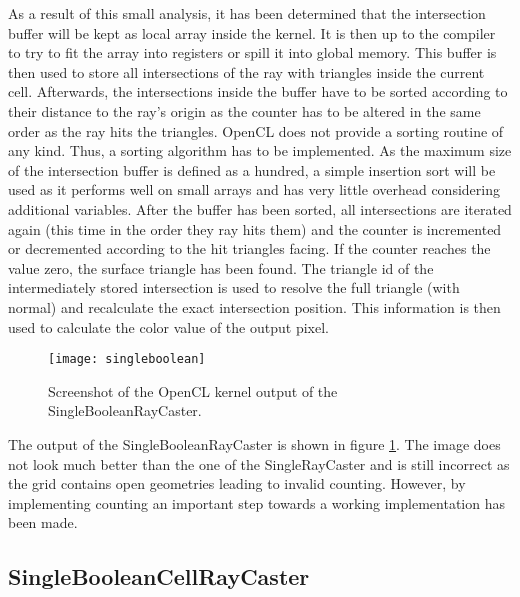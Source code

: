 As a result of this small analysis, it has been determined that the intersection buffer will be kept as local array inside the kernel. It is then up to the compiler to try to fit the array into registers or spill it into global memory. This buffer is then used to store all intersections of the ray with triangles inside the current cell. Afterwards, the intersections inside the buffer have to be sorted according to their distance to the ray's origin as the counter has to be altered in the same order as the ray hits the triangles. OpenCL does not provide a sorting routine of any kind. Thus, a sorting algorithm has to be implemented. As the maximum size of the intersection buffer is defined as a hundred, a simple insertion sort will be used as it performs well on small arrays and has very little overhead considering additional variables. After the buffer has been sorted, all intersections are iterated again (this time in the order they ray hits them) and the counter is incremented or decremented according to the hit triangles facing. If the counter reaches the value zero, the surface triangle has been found. The triangle id of the intermediately stored intersection is used to resolve the full triangle (with normal) and recalculate the exact intersection position. This information is then used to calculate the color value of the output pixel.

\begin{figure}
\centering
\texttt{[image: singleboolean]}
\caption{Screenshot of the OpenCL kernel output of the SingleBooleanRayCaster.}
\label{fig:singleboolean}
\end{figure}

The output of the SingleBooleanRayCaster is shown in figure \ref{fig:singleboolean}. The image does not look much better than the one of the SingleRayCaster and is still incorrect as the grid contains open geometries leading to invalid counting. However, by implementing counting an important step towards a working implementation has been made.

\subsection{SingleBooleanCellRayCaster}
\label{sec:single_boolean_cell}

